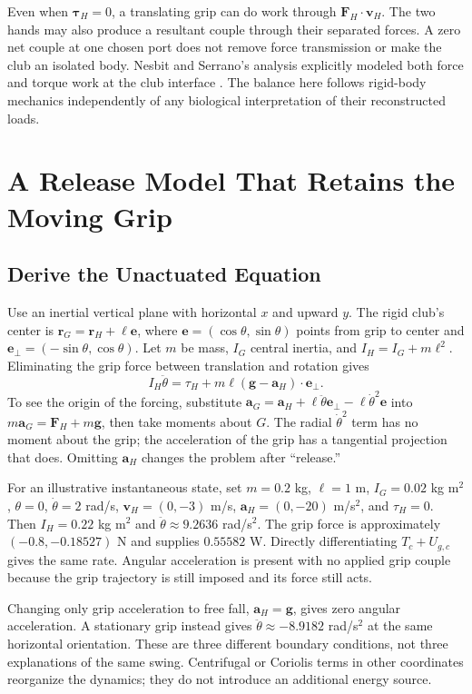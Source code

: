 Even when $\boldsymbol\tau_H=0$, a translating grip can do work through $\mathbf F_H\cdot\mathbf v_H$. The two hands may also produce a resultant couple through their separated forces. A zero net couple at one chosen port does not remove force transmission or make the club an isolated body. Nesbit and Serrano's analysis explicitly modeled both force and torque work at the club interface \citep{Nesbit2005b}. The balance here follows rigid-body mechanics independently of any biological interpretation of their reconstructed loads.

\section{A Release Model That Retains the Moving Grip}
\subsection{Derive the Unactuated Equation}
Use an inertial vertical plane with horizontal $x$ and upward $y$. The rigid club's center is $\mathbf r_G=\mathbf r_H+\ell\mathbf e$, where $\mathbf e=(\cos\theta,\sin\theta)$ points from grip to center and $\mathbf e_\perp=(-\sin\theta,\cos\theta)$. Let $m$ be mass, $I_G$ central inertia, and $I_H=I_G+m\ell^2$. Eliminating the grip force between translation and rotation gives
\begin{equation}
I_H\ddot\theta=\tau_H+m\ell(\mathbf g-\mathbf a_H)\cdot\mathbf e_\perp.
\end{equation}
To see the origin of the forcing, substitute $\mathbf a_G=\mathbf a_H+\ell\ddot\theta\mathbf e_\perp-\ell\dot\theta^2\mathbf e$ into $m\mathbf a_G=\mathbf F_H+m\mathbf g$, then take moments about $G$. The radial $\dot\theta^2$ term has no moment about the grip; the acceleration of the grip has a tangential projection that does. Omitting $\mathbf a_H$ changes the problem after ``release.''

For an illustrative instantaneous state, set $m=0.2$ kg, $\ell=1$ m, $I_G=0.02$ kg m$^2$, $\theta=0$, $\dot\theta=2$ rad/s, $\mathbf v_H=(0,-3)$ m/s, $\mathbf a_H=(0,-20)$ m/s$^2$, and $\tau_H=0$. Then $I_H=0.22$ kg m$^2$ and $\ddot\theta\approx9.2636$ rad/s$^2$. The grip force is approximately $(-0.8,-0.18527)$ N and supplies $0.55582$ W. Directly differentiating $T_c+U_{g,c}$ gives the same rate. Angular acceleration is present with no applied grip couple because the grip trajectory is still imposed and its force still acts.

Changing only grip acceleration to free fall, $\mathbf a_H=\mathbf g$, gives zero angular acceleration. A stationary grip instead gives $\ddot\theta\approx-8.9182$ rad/s$^2$ at the same horizontal orientation. These are three different boundary conditions, not three explanations of the same swing. Centrifugal or Coriolis terms in other coordinates reorganize the dynamics; they do not introduce an additional energy source.


